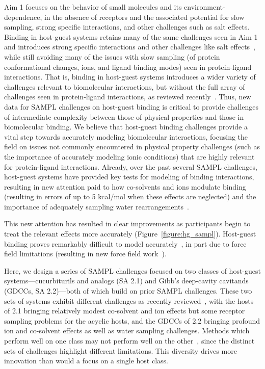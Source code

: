 \documentclass[11pt]{article}
\begin{document}
Aim 1 focuses on the behavior of small molecules and its environment-dependence, in the absence of receptors and the associated potential for slow sampling, strong specific interactions, and other challenges such as salt effects.
Binding in host-guest systems retains many of the same challenges seen in Aim 1 and introduces strong specific interactions and other challenges like salt effects~\cite{mobley_predicting_2016}, while still avoiding many of the issues with slow sampling (of protein conformational changes, ions, and ligand binding modes) seen in protein-ligand interactions.
That is, binding in host-guest systems introduces a wider variety of challenges relevant to biomolecular interactions, but without the full array of challenges seen in protein-ligand interactions, as reviewed recently~\cite{mobley_predicting_2016}.
Thus, new data for SAMPL challenges on host-guest binding is critical to provide challenges of intermediate complexity between those of physical properties and those in biomolecular binding.
We believe that host-guest binding challenges provide a vital step towards accurately modeling biomolecular interactions, focusing the field on issues not commonly encountered in physical property challenges (such as the importance of accurately modeling ionic conditions) that are highly relevant for protein-ligand interactions.
Already, over the past several SAMPL challenges, host-guest systems have provided key tests for modeling of binding interactions, resulting in new attention paid to how co-solvents and ions modulate binding (resulting in errors of up to 5 kcal/mol when these effects are neglected) and the importance of adequately sampling water rearrangements~\cite{muddana_sampl4_2014, mobley_predicting_2016, yin_overview_2016, bhakat_resolving_2016}. 

This new attention has resulted in clear improvements as participants begin to treat the relevant effects more accurately (Figure~\ref{figure:hg_sampl}).
Host-guest binding proves remarkably difficult to model accurately~\cite{henriksen_computational_2015}, in part due to force field limitations (resulting in new force field work~\cite{yin_toward_2015}).


Here, we design a series of SAMPL challenges focused on two classes of host-guest systems---cucurbiturils and analogs (SA 2.1) and Gibb's deep-cavity cavitands (GDCCs, SA 2.2)---both of which build on prior SAMPL challenges.
These two sets of systems exhibit different challenges as recently reviewed~\cite{mobley_predicting_2016}, with the hosts of 2.1 bringing relatively modest co-solvent and ion effects but some receptor sampling problems for the acyclic hosts, and the GDCCs of 2.2 bringing profound ion and co-solvent effects as well as water sampling challenges.
Methods which perform well on one class may not perform well on the other~\cite{mobley_predicting_2016}, since the distinct sets of challenges highlight different limitations.
This diversity drives more innovation than would a focus on a single host class.
\end{document}
